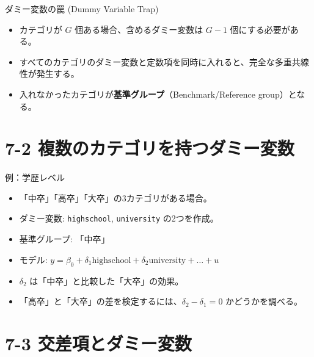 \documentclass[
  ignorenonframetext,
]{beamer}
\providecommand{\tightlist}{%
  \setlength{\itemsep}{0pt}\setlength{\parskip}{0pt}}
\begin{document}
\begin{frame}{ダミー変数の罠 (Dummy Variable Trap)}
\protect\hypertarget{ux30c0ux30dfux30fcux5909ux6570ux306eux7f60-dummy-variable-trap}{}
\begin{itemize}
\tightlist
\item
  カテゴリが \(G\) 個ある場合、含めるダミー変数は \(G-1\)
  個にする必要がある。
\item
  すべてのカテゴリのダミー変数と定数項を同時に入れると、完全な多重共線性が発生する。
\item
  入れなかったカテゴリが\textbf{基準グループ}（Benchmark/Reference
  group）となる。
\end{itemize}
\end{frame}

\hypertarget{ux8907ux6570ux306eux30abux30c6ux30b4ux30eaux3092ux6301ux3064ux30c0ux30dfux30fcux5909ux6570}{%
\section{7-2
複数のカテゴリを持つダミー変数}\label{ux8907ux6570ux306eux30abux30c6ux30b4ux30eaux3092ux6301ux3064ux30c0ux30dfux30fcux5909ux6570}}

\begin{frame}[fragile]{例：学歴レベル}
\protect\hypertarget{ux4f8bux5b66ux6b74ux30ecux30d9ux30eb}{}
\begin{itemize}
\tightlist
\item
  「中卒」「高卒」「大卒」の3カテゴリがある場合。
\item
  ダミー変数: \texttt{highschool}, \texttt{university} の2つを作成。
\item
  基準グループ: 「中卒」
\item
  モデル:
  \(y = \beta_0 + \delta_1 \text{highschool} + \delta_2 \text{university} + \dots + u\)
\item
  \(\delta_2\) は「中卒」と比較した「大卒」の効果。
\item
  「高卒」と「大卒」の差を検定するには、\(\delta_2 - \delta_1 = 0\)
  かどうかを調べる。
\end{itemize}
\end{frame}

\hypertarget{ux4ea4ux5deeux9805ux3068ux30c0ux30dfux30fcux5909ux6570}{%
\section{7-3
交差項とダミー変数}\label{ux4ea4ux5deeux9805ux3068ux30c0ux30dfux30fcux5909ux6570}}
\end{document}
